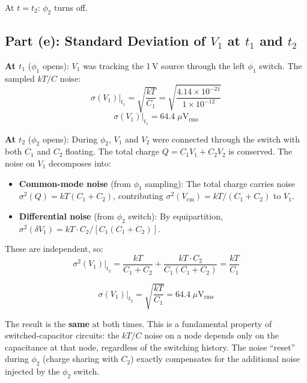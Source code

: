 \documentclass{article}
\begin{document}
At $t = t_2$: $\phi_2$ turns off.

\subsection{Part (e): Standard Deviation of $V_1$ at $t_1$ and $t_2$}

\textbf{At $t_1$} ($\phi_1$ opens): $V_1$ was tracking the 1\,V source through the left $\phi_1$ switch. The sampled $kT/C$ noise:
\begin{equation}
    \sigma(V_1)\big|_{t_1} = \sqrt{\frac{kT}{C_1}} = \sqrt{\frac{4.14 \times 10^{-21}}{1 \times 10^{-12}}}
\end{equation}
\begin{equation}
    \boxed{\sigma(V_1)\big|_{t_1} = 64.4\;\mu\text{V}_\text{rms}}
\end{equation}

\textbf{At $t_2$} ($\phi_2$ opens): During $\phi_2$, $V_1$ and $V_2$ were connected through the switch with both $C_1$ and $C_2$ floating. The total charge $Q = C_1 V_1 + C_2 V_2$ is conserved. The noise on $V_1$ decomposes into:

\begin{itemize}
    \item \textbf{Common-mode noise} (from $\phi_1$ sampling): The total charge carries noise $\sigma^2(Q) = kT(C_1 + C_2)$, contributing $\sigma^2(V_\text{cm}) = kT/(C_1 + C_2)$ to $V_1$.
    \item \textbf{Differential noise} (from $\phi_2$ switch): By equipartition, $\sigma^2(\delta V_1) = kT \cdot C_2/[C_1(C_1 + C_2)]$.
\end{itemize}

These are independent, so:
\begin{equation}
    \sigma^2(V_1)\big|_{t_2} = \frac{kT}{C_1 + C_2} + \frac{kT \cdot C_2}{C_1(C_1 + C_2)} = \frac{kT}{C_1}
\end{equation}

\begin{equation}
    \boxed{\sigma(V_1)\big|_{t_2} = \sqrt{\frac{kT}{C_1}} = 64.4\;\mu\text{V}_\text{rms}}
\end{equation}

The result is the \textbf{same} at both times. This is a fundamental property of switched-capacitor circuits: the $kT/C$ noise on a node depends only on the capacitance at that node, regardless of the switching history. The noise ``reset'' during $\phi_2$ (charge sharing with $C_2$) exactly compensates for the additional noise injected by the $\phi_2$ switch.
\end{document}
